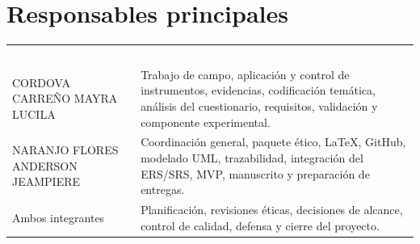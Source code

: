\documentclass[10pt,a4paper]{article}
\newcommand{\Anderson}{NARANJO FLORES ANDERSON JEAMPIERE}
\newcommand{\Mayra}{CORDOVA CARREÑO MAYRA LUCILA}
\begin{document}
\section{Responsables principales}

{\small
{}
\noindent\begin{tabularx}{\textwidth}{L{4.65cm} Y}
\textcolor{white}{\textbf{Responsable}} & \textcolor{white}{\textbf{Funciones dentro del cronograma}}\\
\Mayra & Trabajo de campo, aplicación y control de instrumentos, evidencias, codificación temática, análisis del cuestionario, requisitos, validación y componente experimental.\\
\Anderson & Coordinación general, paquete ético, LaTeX, GitHub, modelado UML, trazabilidad, integración del ERS/SRS, MVP, manuscrito y preparación de entregas.\\
Ambos integrantes & Planificación, revisiones éticas, decisiones de alcance, control de calidad, defensa y cierre del proyecto.\\
\end{tabularx}
}

\clearpage
\end{document}
